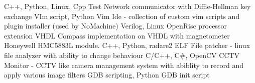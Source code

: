 

\begin{cventries}

  \cventry
    {C++, Python, Linux, Cpp Test }
    {Network communicator with Diffie-Hellman key exchange} 
    {}
    {}
    {}
  \cventry
    {VIm script, Python}
    {Vim Ide - collection of custom vim scripts and plugin installer (used by NoMachine)}
    {}
    {}
    {}
  \cventry
    {Verilog, Linux}
    {OpenRisc processor extension}
    {}
    {}
    {}
  \cventry
    {VHDL}
    {Compass implementation on VHDL with magnetometer Honeywell HMC5883L module.}
    {}
    {}
    {}
  \cventry
    {C++, Python, radare2}
    {ELF File patcher - linux file analyzer with ability to change behaviour}
    {}
    {}
    {}
  \cventry
    {C/C++, C\#, OpenCV}
    {CCTV Monitor - CCTV like camera management system with abiblity to record and apply various image filters}
    {}
    {}
    {}
  \cventry
    {GDB scripting, Python}
    {GDB init script}
    {}
    {}
    {}
\end{cventries}

